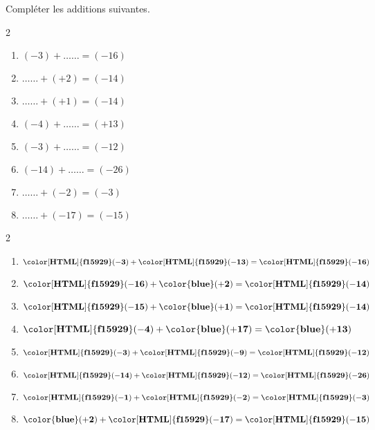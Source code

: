 \begin{exercice*}
    Compléter les additions suivantes.
    \begin{multicols}2
        \begin{enumerate}            
            \item $ (-3) + \ldots\ldots = (-16) $
            \item $ \ldots\ldots + (+2) = (-14) $
            \item $ \ldots\ldots + (+1) = (-14) $
            \item $ (-4) + \ldots\ldots = (+13) $
            \item $ (-3) + \ldots\ldots = (-12) $
            \item $ (-14) + \ldots\ldots = (-26) $
            \item $ \ldots\ldots + (-2) = (-3) $
            \item $ \ldots\ldots + (-17) = (-15) $          
        \end{enumerate}
    \end{multicols}
\end{exercice*}
\begin{corrige}
    \phantom{rrr}    
    \begin{multicols}2
        \begin{enumerate}
            \item $ \mathbf{{\color[HTML]{f15929}(-3)}} + \mathbf{{\color[HTML]{f15929}(-13)}} = \mathbf{{\color[HTML]{f15929}(-16)}} $
            \item $ \mathbf{{\color[HTML]{f15929}(-16)}} + \mathbf{{\color{blue}(+2)}} = \mathbf{{\color[HTML]{f15929}(-14)}} $
            \item $ \mathbf{{\color[HTML]{f15929}(-15)}} + \mathbf{{\color{blue}(+1)}} = \mathbf{{\color[HTML]{f15929}(-14)}} $
            \item $ \mathbf{{\color[HTML]{f15929}(-4)}} + \mathbf{{\color{blue}(+17)}} = \mathbf{{\color{blue}(+13)}} $
            \item $ \mathbf{{\color[HTML]{f15929}(-3)}} + \mathbf{{\color[HTML]{f15929}(-9)}} = \mathbf{{\color[HTML]{f15929}(-12)}} $
            \item $ \mathbf{{\color[HTML]{f15929}(-14)}} + \mathbf{{\color[HTML]{f15929}(-12)}} = \mathbf{{\color[HTML]{f15929}(-26)}} $
            \item $ \mathbf{{\color[HTML]{f15929}(-1)}} + \mathbf{{\color[HTML]{f15929}(-2)}} = \mathbf{{\color[HTML]{f15929}(-3)}} $
            \item $ \mathbf{{\color{blue}(+2)}} + \mathbf{{\color[HTML]{f15929}(-17)}} = \mathbf{{\color[HTML]{f15929}(-15)}} $
        \end{enumerate}   
    \end{multicols}
\end{corrige}